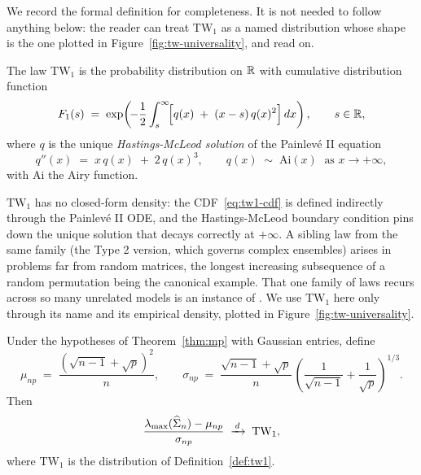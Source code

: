 We record the formal definition for completeness. It is not needed to follow anything below: the reader can treat \(\mathrm{TW}_1\) as a named distribution whose shape is the one plotted in Figure~\ref{fig:tw-universality}, and read on.
\begin{definition}\label{def:tw1}
The  law \(\mathrm{TW}_1\) is the probability distribution on \(\mathbb{R}\) with cumulative distribution function
\begin{equation}
  F_1(s) \;=\; \exp\!\left(\!-\frac{1}{2}\int_s^\infty \!\Bigl[ q(x) \;+\; (x - s)\, q(x)^2 \Bigr]\, dx \right), \qquad s \in \mathbb{R},
  \label{eq:tw1-cdf}
\end{equation}
where \(q\) is the unique \emph{Hastings-McLeod solution} \citep{HastingsMcLeod1980} of the Painlev\'e II equation
\begin{equation}
  q''(x) \;=\; x\, q(x) \;+\; 2\, q(x)^3,
  \qquad q(x) \;\sim\; \mathrm{Ai}(x) \;\text{ as } x \to +\infty,
  \label{eq:painleve-II}
\end{equation}
with \(\mathrm{Ai}\) the Airy function.
\end{definition}

\(\mathrm{TW}_1\) has no closed-form density: the CDF~\eqref{eq:tw1-cdf} is defined indirectly through the Painlev\'e II ODE, and the Hastings-McLeod boundary condition pins down the unique solution that decays correctly at \(+\infty\). A sibling law from the same family (the Type 2 version, which governs complex ensembles) arises in problems far from random matrices, the longest increasing subsequence of a random permutation \citep{BaikDeiftJohansson1999} being the canonical example. That one family of laws recurs across so many unrelated models is an instance of . We use \(\mathrm{TW}_1\) here only through its name and its empirical density, plotted in Figure~\ref{fig:tw-universality}.


\begin{theorem}\label{thm:tw}
Under the hypotheses of Theorem~\ref{thm:mp} with Gaussian entries, define
\begin{equation}
  \mu_{n p} \;=\; \frac{(\sqrt{n - 1} + \sqrt{p})^2}{n}, \qquad
  \sigma_{n p} \;=\; \frac{\sqrt{n - 1} + \sqrt{p}}{n}\, \left(\frac{1}{\sqrt{n - 1}} + \frac{1}{\sqrt{p}}\right)^{1/3}.
  \label{eq:tw-constants}
\end{equation}
Then
\begin{equation}\label{e:lambda-max_Johnstone_TW1}
  \frac{\lambda_{\max}(\widehat{\Sigma}_n) - \mu_{n p}}{\sigma_{n p}} \;\xrightarrow{\,d\,}\; \mathrm{TW}_1,
\end{equation}
where \(\mathrm{TW}_1\) is the distribution of Definition~\ref{def:tw1}.
\end{theorem}

